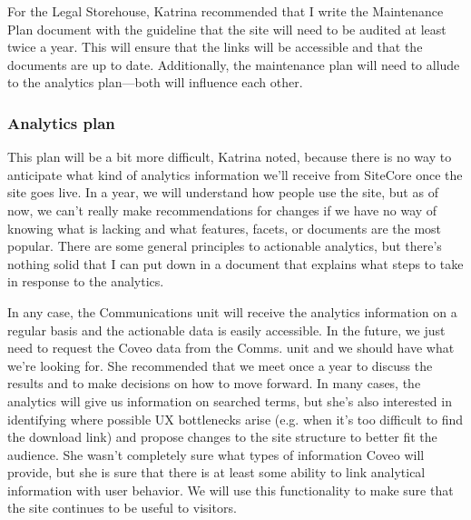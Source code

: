 \documentclass{article}
\begin{document}
For the Legal Storehouse, Katrina recommended that I write the Maintenance Plan document with the guideline that the site will need to be audited at least twice a year. This will ensure that the links will be accessible and that the documents are up to date. Additionally, the maintenance plan will need to allude to the analytics plan---both will influence each other.

\subsubsection{Analytics plan}
This plan will be a bit more difficult, Katrina noted, because there is no way to anticipate what kind of analytics information we'll receive from SiteCore once the site goes live. In a year, we will understand how people use the site, but as of now, we can't really make recommendations for changes if we have no way of knowing what is lacking and what features, facets, or documents are the most popular. There are some general principles to actionable analytics, but there's nothing solid that I can put down in a document that explains what steps to take in response to the analytics. 

In any case, the Communications unit will receive the analytics information on a regular basis and the actionable data is easily accessible. In the future, we just need to request the Coveo data from the Comms. unit and we should have what we're looking for. She recommended that we meet once a year to discuss the results and to make decisions on how to move forward. In many cases, the analytics will give us information on searched terms, but she's also interested in identifying where possible UX bottlenecks arise (e.g. when it's too difficult to find the download link) and propose changes to the site structure to better fit the audience. She wasn't completely sure what types of information Coveo will provide, but she is sure that there is at least some ability to link analytical information with user behavior. We will use this functionality to make sure that the site continues to be useful to visitors.
\end{document}
